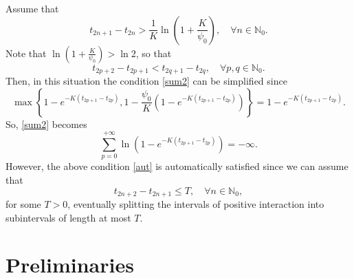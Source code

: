 \documentclass[a4paper,11pt,oneside]{article}
\begin{document}
\begin{oss}\label{boundpsi}
Assume that $$t_{2n+1}-t_{2n}>\frac{1}{K}\ln\left(1+\frac{K}{\psi_{0}}\right),\quad \forall n\in \mathbb{N}_{0}.$$
Note that $\ln\left(1+\frac{K}{\psi_{0}}\right)>\ln2$, so that $$t_{2p+2}-t_{2p+1}<t_{2q+1}-t_{2q},\quad \forall p,q\in \mathbb{N}_0.$$ 
Then, in this situation the condition \eqref{sum2} can be simplified since $$\max\left\{1-e^{-K(t_{2p+1}-t_{2p})},1-\frac{\psi_{0}}{K}(1-e^{-K(t_{2p+1}-t_{2p})})\right\}=1-e^{-K(t_{2p+1}-t_{2p})}.$$
So, \eqref{sum2} becomes
	\begin{equation}\label{aut}
		\sum_{p=0}^{+\infty}\ln\left(1-e^{-K(t_{2p+1}-t_{2p})}\right)=-\infty.
	\end{equation} 
However, the above condition \eqref{aut} is automatically satisfied since we can assume that $$t_{2n+2}-t_{2n+1}\leq T,\quad \forall n \in \mathbb{N}_{0},$$
for some $T>0$, eventually splitting the intervals of positive interaction into subintervals of length at most $T$.
\end{oss}
	\section{Preliminaries}
	\setcounter{equation}{0}
	
\end{document}
